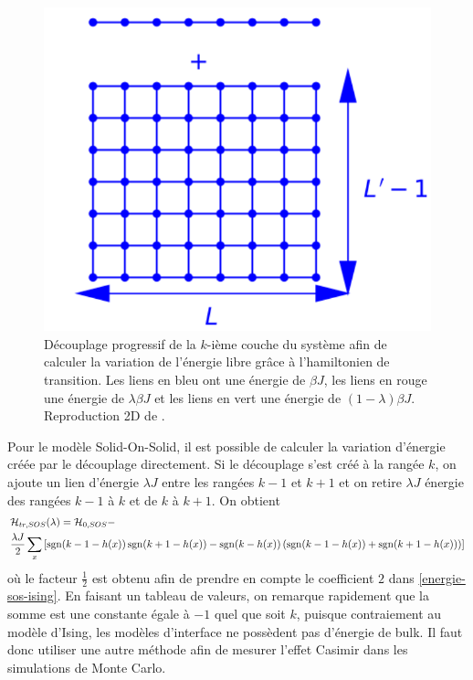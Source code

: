 \begin{figure}
\begin{minipage}[t]{0.3\linewidth}
		\includegraphics[width=\linewidth]{numerical/cross-h1.pdf}
		\caption*{$\mH_1$}
	\end{minipage}
	\caption{Découplage progressif de la $k$-ième couche du système afin de calculer la variation de l'énergie libre grâce à l'hamiltonien de transition. Les liens en bleu ont une énergie de $\beta J$, les liens en rouge une énergie de $\lambda \beta J $ et les liens en vert une énergie de $ (1-\lambda) \beta J$. Reproduction 2D de \cite{vasilyev_monte_2007}.}
	\label{decouplage}
\end{figure}

Pour le modèle Solid-On-Solid, il est possible de calculer la variation d'énergie créée par le découplage directement. Si le découplage s'est créé à la rangée $k$, on ajoute un lien d'énergie $\lambda J$ entre les rangées $k-1$ et $k+1$ et on retire $\lambda J$ énergie des rangées $k-1$ à $k$  et de $k$ à $k+1$. On obtient
\begin{align}
    &\mathcal{H}_{tr,SOS}(\lambda) = \mathcal{H}_{0,SOS} - \nonumber \\
     &\frac{\lambda J}{2} \sum_x \left[ \operatorname{sgn}(k-1-h(x)) \operatorname{sgn}(k+1-h(x)) - \operatorname{sgn}(k-h(x)) \left( \operatorname{sgn}(k-1-h(x))+\operatorname{sgn}(k+1-h(x)) \right) \right]
\end{align}
où le facteur $\frac{1}{2}$ est obtenu afin de prendre en compte le coefficient $2$ dans \ref{energie-sos-ising}. En faisant un tableau de valeurs, on remarque rapidement que la somme est une constante égale à $-1$ quel que soit $k$, puisque contraiement au modèle d'Ising, les modèles d'interface ne possèdent pas d'énergie de bulk. Il faut donc utiliser une autre méthode afin de mesurer l'effet Casimir dans les simulations de Monte Carlo.	
	
